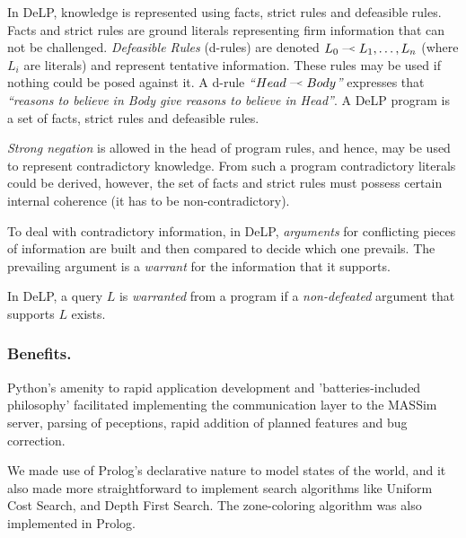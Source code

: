 \documentclass{llncs2e/llncs}
\begin{document}
    \newcommand{\drule}[2]{\mbox{$ #1\; \defleftarrow \; #2$}}
    \newcommand{\defleftarrow}{{\raise1.5pt\hbox{\tiny\defleft}}}
    \newcommand{\defleft}{\mbox{---\hspace{-1.5pt}\raise.05pt\hbox{$<$}}}

    In DeLP\cite{Garcia:2004a}, knowledge is represented using facts, strict rules
    and defeasible rules. Facts and strict rules are ground literals representing
    firm information that can not be challenged. \textit{Defeasible Rules}
    (d-rules) are denoted $\drule{L_0}{L_1, \ldots, L_n}$ (where $L_i$ are literals)
    and represent tentative information. These rules may be used if nothing could
    be posed against it. A d-rule \textit{``\drule{Head}{Body}''} expresses that
    \textit{``reasons to believe in Body give reasons to believe in Head''}. A DeLP
    program is a set of facts, strict rules and defeasible rules. 

    {\it Strong negation} is allowed in the head of program rules, and hence, may
    be used to represent contradictory knowledge. From such a program contradictory
    literals could be derived, however,  the set of facts and strict rules must
    possess certain internal coherence (it has to be non-contradictory). 

    To deal with contradictory information, in DeLP, \emph{arguments} for
    conflicting pieces of information are built and then compared to decide which
    one prevails. The prevailing argument is a \emph{warrant} for the information
    that it supports.

    In DeLP, a query $L$ is \emph{warranted} from a program if a \emph{non-defeated}
    argument that supports $L$ exists. %

\subsubsection{Benefits.}
    
    Python's amenity to rapid application development and 'batteries-included 
    philosophy' facilitated implementing the communication layer to the MASSim 
    server, parsing of peceptions, rapid addition of planned features and bug 
    correction.

    We made use of Prolog's declarative nature to model states of the world, and it 
    also made more straightforward to implement search algorithms like Uniform Cost 
    Search, and Depth First Search. The zone-coloring algorithm was also 
    implemented in Prolog.
    
\end{document}

